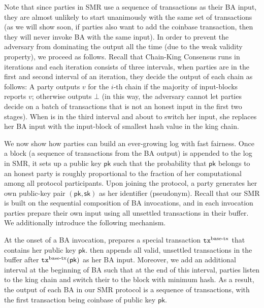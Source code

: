 Note that since parties in SMR use a sequence of transactions as their BA input, they are almost unlikely to start unanimously with the same set of transactions (as we will show soon, if parties also want to add the coinbase transaction, then they will never invoke BA with the same input).
%
In order to prevent the adversary from dominating the output all the time (due to the weak validity property), we proceed as follows.
%
Recall that Chain-King Consensus runs in iterations and each iteration consists of three intervals, when parties are in the first and second interval of an iteration, they decide the output of each chain as follows:
%
A party \party outputs $v$ for the $i$-th chain if the majority of input-blocks reports $v$; otherwise \party outputs $\bot$ (in this way, the adversary cannot let parties decide on a batch of transactions that is not an honest input in the first two stages).
%
When \party is in the third interval and about to switch her input, she replaces her BA input with the input-block of smallest hash value in the king chain.

We now show how parties can build an ever-growing log with fast fairness.
%
Once a block (a sequence of transactions from the BA output) is appended to the log in SMR, it sets up a public key $\mathsf{pk}$ such that the probability that $\mathsf{pk}$ belongs to an honest party is roughly proportional to the fraction of her computational among all protocol participants.
%
Upon joining the protocol, a party \party generates her own public-key pair $(\mathsf{pk}, \mathsf{sk})$ as her identifier (pseudonym).
%
Recall that our SMR is built on the sequential composition of BA invocations, and in each invocation parties prepare their own input using all unsettled transactions in their buffer.
%
We additionally introduce the following mechanism.

At the onset of a BA invocation, \party prepares a special transaction $\mathtt{tx}^{\text{base-tx}}$ that contains her public key $\mathsf{pk}$.
%
\party then appends all valid, unsettled transactions in the buffer after $\mathtt{tx}^{\text{base-tx}}(\mathsf{pk})$ as her BA input.
%
Moreover, we add an additional interval at the beginning of BA such that at the end of this interval, parties listen to the king chain and switch their \val to the block with minimum hash.
%
As a result, the output of each BA in our SMR protocol is a sequence of transactions, with the first transaction being coinbase of public key $\mathsf{pk}$.

